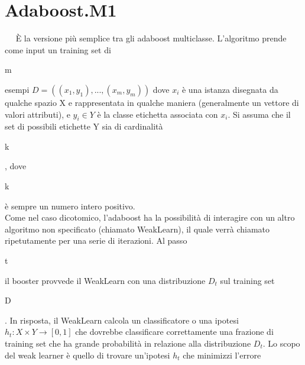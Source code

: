 \section{Adaboost.M1}
\ \
\newline
\`E la versione pi\`u semplice tra gli adaboost multiclasse. L'algoritmo prende come input un training set di
\begin{it}m\end{it} esempi \begin{math} D = ((x_1,y_1), . . . , (x_m,y_m)) \end{math} dove \begin{math}x_i\end{math} 
\`e una istanza disegnata da qualche spazio X e rappresentata in qualche maniera (generalmente un vettore di valori attributi),
 e \begin{math}y_i \in Y \end{math} \`e la classe etichetta associata con \begin{math}x_i\end{math}. Si assuma che
il set di possibili etichette Y sia di cardinalit\`a \begin{it}k\end{it}, 
dove \begin{it}k\end{it} \`e sempre un numero intero positivo.\\
\newline
Come nel caso dicotomico, l'adaboost ha la possibilit\`a di interagire con un altro algoritmo non specificato
(chiamato WeakLearn), il quale verr\`a chiamato ripetutamente 
per una serie di iterazioni. Al passo \begin{it}t\end{it}
il booster provvede il WeakLearn con una distribuzione \begin{math}D_t\end{math} sul training set \begin{it}D\end{it}.
 In risposta, il WeakLearn calcola un classificatore o una ipotesi
 \begin{math}h_t : X \times Y \to \left[0,1\right]\end{math} che dovrebbe classificare correttamente
una frazione di training set che ha grande probabilit\`a in relazione 
alla distribuzione \begin{math}D_t\end{math}. Lo scopo del
weak learner \`e quello di trovare un'ipotesi \begin{math}h_t\end{math} che minimizzi l'errore 
